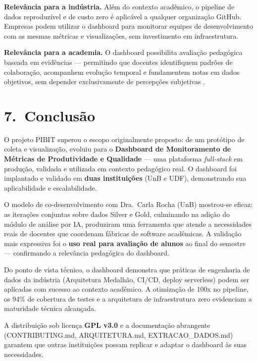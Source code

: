 \documentclass[
	12pt,
	openright,
	oneside,
	a4paper,
	brazil
]{abntex2}
\begin{document}
\textbf{Relevância para a indústria.} Além do contexto acadêmico, o pipeline de dados reproduzível e de custo zero é aplicável a qualquer organização GitHub. Empresas podem utilizar o dashboard para monitorar equipes de desenvolvimento com as mesmas métricas e visualizações, sem investimento em infraestrutura.

\textbf{Relevância para a academia.} O dashboard possibilita avaliação pedagógica baseada em evidências --- permitindo que docentes identifiquem padrões de colaboração, acompanhem evolução temporal e fundamentem notas em dados objetivos, sem depender exclusivamente de percepções subjetivas \cite{oliveira2017conduccao,dos2021experiencia}.

\section*{7.\ Conclusão}

O projeto PIBIT superou o escopo originalmente proposto: de um protótipo de coleta e visualização, evoluiu para o \textbf{Dashboard de Monitoramento de Métricas de Produtividade e Qualidade} --- uma plataforma \textit{full-stack} em produção, validada e utilizada em contexto pedagógico real. O dashboard foi implantado e validado em \textbf{duas instituições} (UnB e UDF), demonstrando sua aplicabilidade e escalabilidade.

O modelo de co-desenvolvimento com Dra.\ Carla Rocha (UnB) mostrou-se eficaz: as iterações conjuntas sobre dados Silver e Gold, culminando na adição do módulo de análise por IA, produziram uma ferramenta que atende a necessidades reais de docentes que coordenam fábricas de software acadêmicas. A validação mais expressiva foi o \textbf{uso real para avaliação de alunos} ao final do semestre --- confirmando a relevância pedagógica do dashboard.

Do ponto de vista técnico, o dashboard demonstra que práticas de engenharia de dados da indústria (Arquitetura Medalhão, CI/CD, deploy serverless) podem ser aplicadas com sucesso ao contexto acadêmico. A otimização de 100x no pipeline, os 94\% de cobertura de testes e a arquitetura de infraestrutura zero evidenciam a maturidade técnica alcançada.

A distribuição sob licença \textbf{GPL v3.0} e a documentação abrangente (CONTRIBUTING.md, ARQUITETURA.md, EXTRACAO\_DADOS.md) garantem que outras instituições possam replicar e adaptar o dashboard às suas necessidades.
\end{document}
